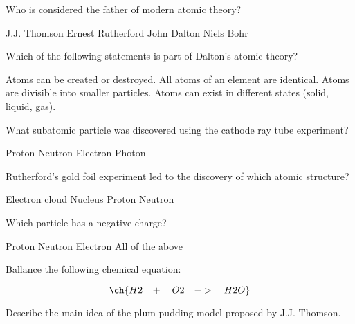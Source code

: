 \documentclass{exam}
\begin{document}
\begin{center}
\end{center}


\begin{questions}
    
\question[2] Who is considered the father of modern atomic theory?
\begin{checkboxes}
    \choice J.J. Thomson 
    \choice Ernest Rutherford
    \choice John Dalton 
    \choice Niels Bohr 
\end{checkboxes}


\question[2] Which of the following statements is part of Dalton's atomic theory?
\begin{checkboxes}
    \choice Atoms can be created or destroyed.  
    \choice All atoms of an element are identical.  
    \choice Atoms are divisible into smaller particles.  
    \choice Atoms can exist in different states (solid, liquid, gas). 
\end{checkboxes}

\question[2] What subatomic particle was discovered using the cathode ray tube experiment?
\begin{checkboxes}
    \choice Proton  
    \choice Neutron  
    \choice Electron  
    \choice Photon 
\end{checkboxes}

\question[2] Rutherford's gold foil experiment led to the discovery of which atomic structure?  
\begin{checkboxes}
    \choice Electron cloud  
    \choice Nucleus  
    \choice Proton  
    \choice Neutron  
\end{checkboxes}

\question[2] Which particle has a negative charge?
\begin{checkboxes}
    \choice Proton  
    \choice Neutron  
    \choice Electron  
    \choice All of the above  
\end{checkboxes}  

\question[5] Ballance the following chemical equation:

\begin{equation}
    \ch{ H2 \;\;\;  +  \quad  O2 \quad ->  \quad H2O}
\end{equation}

\question[5] Describe the main idea of the plum pudding model proposed by J.J. Thomson.  


\end{questions}
\end{document}
